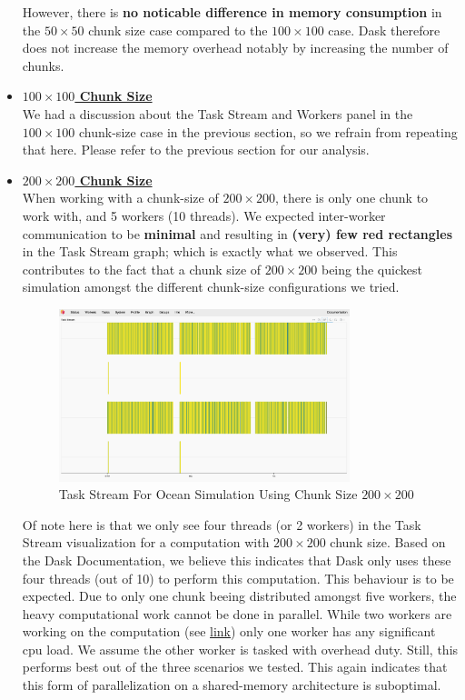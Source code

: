 \documentclass[a4paper,12pt]{article}
\begin{document}
\begin{itemize}
However, there is \textbf{no noticable difference in memory consumption} in the $50 \times 50$ chunk size case compared to the $100 \times 100$ case.
Dask therefore does not increase the memory overhead notably by increasing the number of chunks.

\item \textbf{\underline{$100 \times 100$ Chunk Size}} \\
We had a discussion about the Task Stream and Workers panel in the $100 \times 100$ chunk-size case in the previous section, so we refrain from repeating that here. Please refer to the previous section for our analysis.

\item \textbf{\underline{$200 \times 200$ Chunk Size}} \\
  When working with a chunk-size of $200 \times 200$, there is only one chunk to work with, and 5 workers (10 threads).
  We expected inter-worker communication to be \textbf{minimal} and resulting in \textbf{(very) few red rectangles} in the Task Stream graph; which is exactly what we observed.
  This contributes to the fact that a chunk size of $200 \times 200$ being the quickest simulation amongst the different chunk-size configurations we tried.

\begin{figure}[H]
  \centering
  \includegraphics[width=0.8\textwidth]{../images/task_stream_200chunk.png}
  \caption{Task Stream For Ocean Simulation Using Chunk Size $200 \times 200$}
\end{figure}

Of note here is that we only see four threads (or 2 workers) in the Task Stream visualization for a computation with $200 \times 200$ chunk size. Based on the Dask Documentation, we believe this indicates that Dask only uses these four threads (out of 10) to perform this computation.
This behaviour is to be expected.
Due to only one chunk beeing distributed amongst five workers, the heavy computational work cannot be done in parallel.
While two workers are working on the computation (see \href{https://github.com/paulmyr/DD2358-HPC25/tree/master/04_parallel/bonus#chunk-size-200}{link}) only one worker has any significant cpu load.
We assume the other worker is tasked with overhead duty.
Still, this performs best out of the three scenarios we tested.
This again indicates that this form of parallelization on a shared-memory architecture is suboptimal.


\end{itemize}
\end{document}
